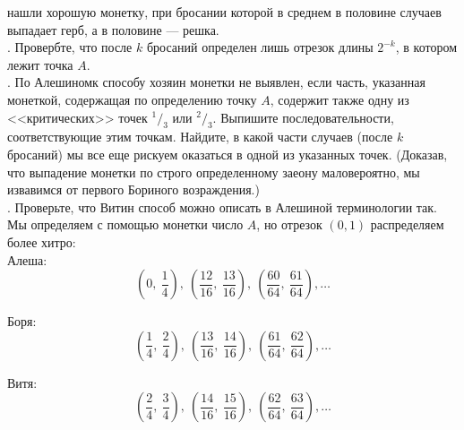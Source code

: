 \newpage
{} %

\begin{multicols}{2} %
\noindent %
нашли хорошую монетку, при бросании которой в среднем в половине случаев выпадает герб, а в половине --- решка.\\
    . Провербте, что после \(k\) бросаний определен лишь отрезок длины \(2^{-k}\), в котором лежит точка $A$.\\
    . По Алешиномк способу хозяин монетки не выявлен, если часть, указанная монеткой, содержащая по определению точку $A$, содержит также одну из <<критических>> точек $^1/_3$ или $^2/_3$. Выпишите последовательности, соответствующие этим точкам. Найдите, в какой части случаев (после $k$ бросаний) мы все еще рискуем оказаться в одной из указанных точек. (Доказав, что выпадение монетки по строго определенному заеону маловероятно, мы извавимся от первого Бориного возраждения.)\\
    . Проверьте, что Витин способ можно описать в Алешиной терминологии так. Мы определяем с помощью монетки  число $A$, но отрезок $(0,1)$ распределяем более хитро:\\
    
    Алеша:\\[-2mm]
        \[ \left(0,\ \frac 1 4\right),\ \left(\frac {12} {16},\ \frac{13} {16}\right),\ \left(\frac{60} {64},\ \frac {61} {64}\right), \ldots \]
        
    Боря:\\[-2mm]
        \[ \left(\frac 1 4,\ \frac 2 4\right),\ \left(\frac {13} {16},\ \frac{14} {16}\right),\ \left(\frac{61} {64},\ \frac {62} {64}\right), \ldots \]
            
    Витя:\\[-2mm]
        \[ \left(\frac 2 4,\ \frac 3 4\right),\ \left(\frac {14} {16},\ \frac{15} {16}\right),\ \left(\frac{62} {64},\ \frac {63} {64}\right), \ldots \]
    

\end{multicols}
